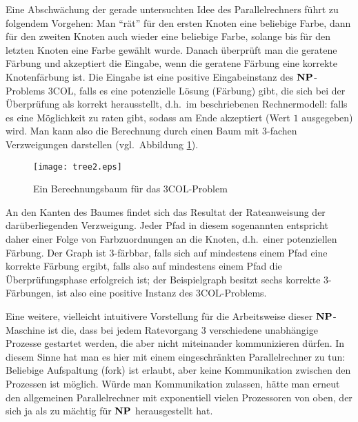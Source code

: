 Eine Abschwächung der gerade untersuchten Idee des Parallelrechners
führt zu folgendem Vorgehen: Man "`rät"' für den ersten Knoten eine
beliebige Farbe, dann für den zweiten Knoten auch wieder eine
beliebige Farbe, solange bis für den letzten Knoten eine Farbe gewählt
wurde. Danach überprüft man die geratene Färbung und akzeptiert die
Eingabe, wenn die geratene Färbung eine korrekte Knotenfärbung
ist. Die Eingabe ist eine positive Eingabeinstanz des $\mathbf{N}\mathbf{P}$-Problems
$3\mathrm{COL}$, falls es eine potenzielle Lösung (Färbung) gibt, die
sich bei der Überprüfung als korrekt herausstellt, d.h.~im
beschriebenen Rechnermodell: falls es eine Möglichkeit zu raten gibt,
sodass am Ende akzeptiert (Wert $1$ ausgegeben) wird. Man kann also
die Berechnung durch einen Baum mit $3$-fachen Verzweigungen
darstellen (vgl.~Abbildung \ref{Tree3COL}).
%
\begin{figure}
\centerline{\texttt{[image: tree2.eps]}}
\caption{Ein Berechnungsbaum für das $3\mathrm{COL}$-Problem}
\label{Tree3COL}
\end{figure}
%
An den Kanten des Baumes findet sich das Resultat der Rateanweisung
der darüberliegenden Verzweigung. Jeder Pfad in diesem sogenannten
 entspricht daher einer Folge von
Farbzuordnungen an die Knoten, d.h.~einer potenziellen Färbung. Der
Graph ist $3$-färbbar, falls sich auf mindestens einem Pfad eine
korrekte Färbung ergibt, falls also auf mindestens einem Pfad die
Überprüfungsphase 
erfolgreich ist; der Beispielgraph besitzt sechs korrekte $3$-Färbungen, 
ist also eine positive Instanz des $3\mathrm{COL}$-Problems.

Eine weitere, vielleicht intuitivere Vorstellung für die Arbeitsweise
dieser $\mathbf{N}\mathbf{P}$-Ma\-schi\-ne ist die, dass bei jedem Ratevorgang $3$
verschiedene unabhängige Prozesse gestartet werden, die aber nicht
miteinander kommunizieren dürfen. In diesem Sinne hat man es hier mit
einem eingeschränkten Parallelrechner zu tun: Beliebige Aufspaltung
(fork) ist erlaubt, aber keine Kommunikation zwischen den Prozessen
ist möglich. Würde man Kommunikation zulassen, hätte man erneut den
allgemeinen Parallelrechner mit exponentiell vielen Prozessoren von
oben, der sich ja als zu mächtig für $\mathbf{N}\mathbf{P}$ herausgestellt hat.

